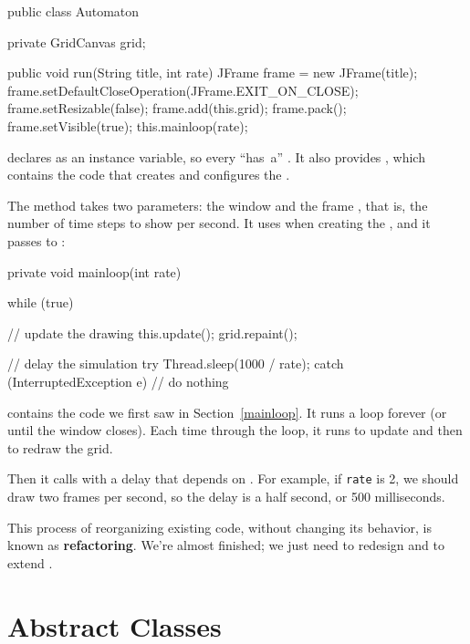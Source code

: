 \begin{code}
public class Automaton {
    private GridCanvas grid;

    public void run(String title, int rate) {
        JFrame frame = new JFrame(title);
        frame.setDefaultCloseOperation(JFrame.EXIT_ON_CLOSE);
        frame.setResizable(false);
        frame.add(this.grid);
        frame.pack();
        frame.setVisible(true);
        this.mainloop(rate);
    }
}
\end{code}

 declares  as an instance variable, so every  ``has~a'' .
It also provides , which contains the code that creates and configures the .

The  method takes two parameters: the window  and the frame , that is, the number of time steps to show per second.
It uses  when creating the , and it passes  to :

\begin{code}
private void mainloop(int rate) {
    while (true) {

        // update the drawing
        this.update();
        grid.repaint();

        // delay the simulation
        try {
            Thread.sleep(1000 / rate);
        } catch (InterruptedException e) {
            // do nothing
        }
    }
}
\end{code}

 contains the code we first saw in Section~\ref{mainloop}.
It runs a  loop forever (or until the window closes).
Each time through the loop, it runs  to update  and then  to redraw the grid.

Then it calls  with a delay that depends on .
For example, if {\tt rate} is 2, we should draw two frames per second, so the delay is a half second, or 500 milliseconds.


This process of reorganizing existing code, without changing its behavior, is known as {\bf refactoring}.
We're almost finished; we just need to redesign  and  to extend .


\section{Abstract Classes}

